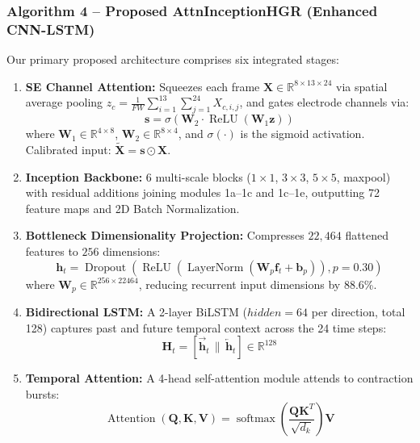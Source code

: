 \documentclass[conference]{IEEEtran}
\begin{document}
\subsubsection{Algorithm 4 -- Proposed AttnInceptionHGR (Enhanced CNN-LSTM)}
Our primary proposed architecture comprises six integrated stages:
\begin{enumerate}
    \item \textbf{SE Channel Attention:} Squeezes each frame $\mathbf{X} \in \mathbb{R}^{8 \times 13 \times 24}$ via spatial average pooling $z_c = \frac{1}{FW} \sum_{i=1}^{13} \sum_{j=1}^{24} X_{c,i,j}$, and gates electrode channels via:
    \begin{equation}
    \mathbf{s} = \sigma\left(\mathbf{W}_2 \cdot \operatorname{ReLU}(\mathbf{W}_1 \mathbf{z})\right)
    \end{equation}
    where $\mathbf{W}_1 \in \mathbb{R}^{4 \times 8}$, $\mathbf{W}_2 \in \mathbb{R}^{8 \times 4}$, and $\sigma(\cdot)$ is the sigmoid activation. Calibrated input: $\widetilde{\mathbf{X}} = \mathbf{s} \odot \mathbf{X}$.
    \item \textbf{Inception Backbone:} 6 multi-scale blocks ($1\times1$, $3\times3$, $5\times5$, maxpool) with residual additions joining modules 1a--1c and 1c--1e, outputting 72 feature maps and 2D Batch Normalization.
    \item \textbf{Bottleneck Dimensionality Projection:} Compresses $22,464$ flattened features to $256$ dimensions:
    \begin{equation}
    \mathbf{h}_t = \operatorname{Dropout}\left(\operatorname{ReLU}\left(\operatorname{LayerNorm}\left(\mathbf{W}_p \mathbf{f}_t + \mathbf{b}_p\right)\right), p=0.30\right)
    \end{equation}
    where $\mathbf{W}_p \in \mathbb{R}^{256 \times 22464}$, reducing recurrent input dimensions by 88.6\%.
    \item \textbf{Bidirectional LSTM:} A 2-layer BiLSTM ($hidden=64$ per direction, total 128) captures past and future temporal context across the 24 time steps:
    \begin{equation}
    \mathbf{H}_t = [\overrightarrow{\mathbf{h}}_t \,\|\, \overleftarrow{\mathbf{h}}_t] \in \mathbb{R}^{128}
    \end{equation}
    \item \textbf{Temporal Attention:} A 4-head self-attention module attends to contraction bursts:
    \begin{equation}
    \operatorname{Attention}(\mathbf{Q}, \mathbf{K}, \mathbf{V}) = \operatorname{softmax}\left(\frac{\mathbf{Q} \mathbf{K}^T}{\sqrt{d_k}}\right)\mathbf{V}

\end{equation}
\end{enumerate}
\end{document}
